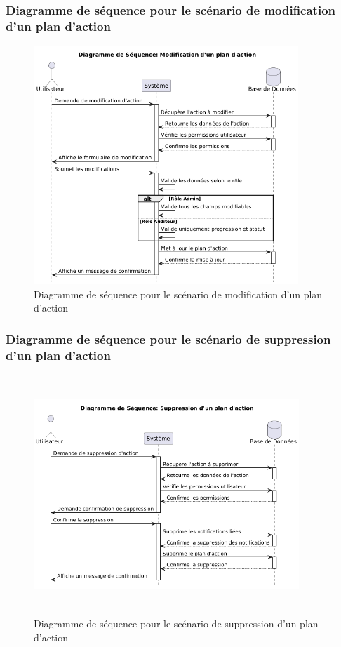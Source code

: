 \subsubsection{Diagramme de séquence pour le scénario de modification d'un plan d'action}
\begin{figure}[H]
    \centering
    \includegraphics[width=10cm,height=9cm]{images/modifyactionseq.png}
    \caption{Diagramme de séquence pour le scénario de modification d'un plan d'action}
\end{figure}

\subsubsection{Diagramme de séquence pour le scénario de suppression d'un plan d'action}
\begin{figure}[H]
    \centering
    \includegraphics[width=10cm,height=9cm]{images/deleteactionseq.png}
    \caption{Diagramme de séquence pour le scénario de suppression d'un plan d'action}
\end{figure}
